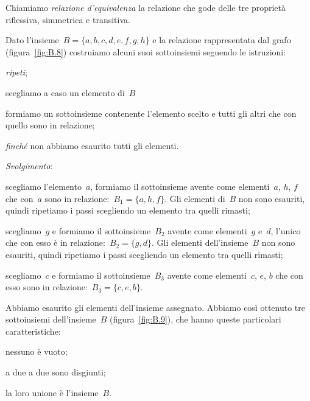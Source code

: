 \begin{definizione}
Chiamiamo \emph{relazione d'equivalenza} la relazione che gode delle tre 
proprietà riflessiva, simmetrica e transitiva.
\end{definizione}


\begin{exrig}
 \begin{esempio}

Dato l'insieme~$B = \lbrace a, b, c, d, e, f, g, h \rbrace$ e la relazione 
rappresentata dal grafo (figura~\ref{fig:B.8}) costruiamo alcuni suoi 
sottoinsiemi seguendo le istruzioni:
\begin{itemize*}
\item \emph{ripeti};
\item scegliamo a caso un elemento di~$B$
\item formiamo un sottoinsieme contenente l'elemento scelto e tutti gli altri 
che con quello sono in relazione;
\item \emph{finché} non abbiamo esaurito tutti gli elementi.
\end{itemize*}


\emph{Svolgimento}:
\begin{itemize*}
\item scegliamo l'elemento~$a$, formiamo il sottoinsieme avente come 
elementi~$a$, $h$, $f$ che con~$a$ sono in relazione:~$B_1 = \lbrace a, h, f 
\rbrace$.
Gli elementi di~$B$ non sono esauriti, quindi ripetiamo i passi scegliendo un 
elemento tra quelli rimasti;
\item scegliamo~$g$ e formiamo il sottoinsieme~$B_2$ avente come elementi~$g$ 
e~$d$, l'unico che con esso è in relazione:~$B_2 = \lbrace g, d \rbrace$.
Gli elementi dell'insieme~$B$ non sono esauriti, quindi ripetiamo i passi 
scegliendo un elemento tra quelli rimasti;
\item scegliamo~$c$ e formiamo il sottoinsieme~$B_3$ avente come elementi~$c$, 
$e$, $b$ che con esso sono in relazione:~$B_3 = \lbrace c, e, b \rbrace$.
\end{itemize*}

Abbiamo esaurito gli elementi dell'insieme assegnato. Abbiamo così ottenuto tre 
sottoinsiemi dell'insieme~$B$ (figura~\ref{fig:B.9}), che hanno queste 
particolari caratteristiche:

\begin{itemize*}
\item nessuno è vuoto;
\item a due a due sono disgiunti;
\item la loro unione è l'insieme~$B$.
\end{itemize*}
 \end{esempio}
\end{exrig}

